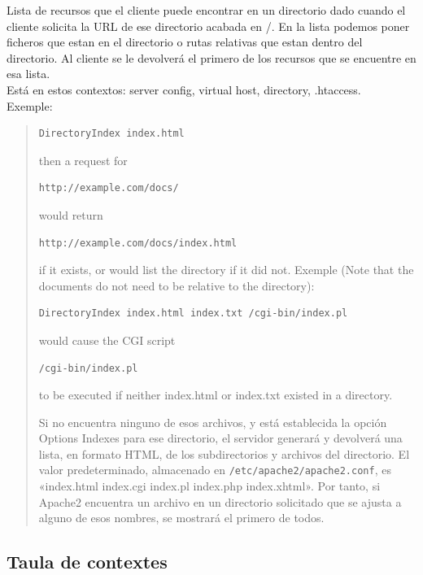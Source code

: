 \documentclass[a4paper, 11pt]{article}
\begin{document}
Lista de recursos que el cliente puede encontrar en un directorio dado cuando el cliente solicita la URL de ese directorio acabada en \slash. En la lista podemos poner ficheros que estan en el directorio o rutas relativas que estan dentro del directorio. Al cliente se le devolverá el primero de los recursos que se encuentre en esa lista.\\
Está en estos contextos: server config, virtual host, directory, .htaccess.\\
Exemple: 
\begin{quotation}
\noindent
\begin{verbatim}
DirectoryIndex index.html
\end{verbatim}
then a request for 
\begin{verbatim}
http://example.com/docs/
\end{verbatim}
would return 
\begin{verbatim}
http://example.com/docs/index.html
\end{verbatim}
\noindent
if it exists, or would list the directory if it did not.
Exemple (Note that the documents do not need to be relative to the directory):
\begin{verbatim}
DirectoryIndex index.html index.txt /cgi-bin/index.pl
\end{verbatim}
would cause the CGI script 
\begin{verbatim}
/cgi-bin/index.pl
\end{verbatim}
to be executed if neither index.html or index.txt existed in a directory.

Si no encuentra ninguno de esos archivos, y está establecida la opción Options Indexes para ese directorio, el servidor generará y devolverá una lista, en formato HTML, de los subdirectorios y archivos del directorio. El valor predeterminado, almacenado en \verb+/etc/apache2/apache2.conf+, es «index.html index.cgi index.pl index.php index.xhtml». Por tanto, si Apache2 encuentra un archivo en un directorio solicitado que se ajusta a alguno de esos nombres, se mostrará el primero de todos. 
\end{quotation}

\subsection{Taula de contextes}
\end{document}
